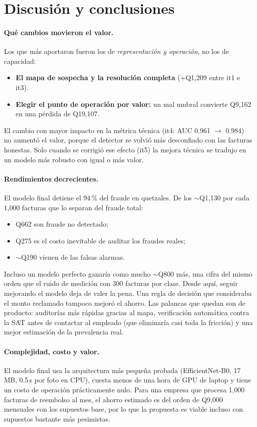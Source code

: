 \documentclass[11pt,letterpaper]{article}
\begin{document}
\section{Discusión y conclusiones}

\paragraph{Qué cambios movieron el valor.} Los que más aportaron fueron los de \emph{representación y operación}, no los de capacidad:
\begin{itemize}
  \item \textbf{El mapa de sospecha y la resolución completa} (+Q1,209 entre it1 e it3).
  \item \textbf{Elegir el punto de operación por valor:} un mal umbral convierte Q9,162 en una pérdida de Q19,107.
\end{itemize}
El cambio con mayor impacto en la métrica técnica (it4: AUC 0.961 $\to$ 0.984) no aumentó el valor, porque el detector se volvió más desconfiado con las facturas honestas. Solo cuando se corrigió ese efecto (it5) la mejora técnica se tradujo en un modelo más robusto con igual o más valor.

\paragraph{Rendimientos decrecientes.} El modelo final detiene el 94\,\% del fraude en quetzales. De los ${\sim}$Q1,130 por cada 1,000 facturas que lo separan del fraude total:
\begin{itemize}
  \item Q662 son fraude no detectado;
  \item Q275 es el costo inevitable de auditar los fraudes reales;
  \item ${\sim}$Q190 vienen de las falsas alarmas.
\end{itemize}
Incluso un modelo perfecto ganaría como mucho ${\sim}$Q800 más, una cifra del mismo orden que el ruido de medición con 300 facturas por clase. Desde aquí, seguir mejorando el modelo deja de valer la pena. Una regla de decisión que consideraba el monto reclamado tampoco mejoró el ahorro. Las palancas que quedan son de producto: auditorías más rápidas gracias al mapa, verificación automática contra la SAT antes de contactar al empleado (que eliminaría casi toda la fricción) y una mejor estimación de la prevalencia real.

\paragraph{Complejidad, costo y valor.} El modelo final usa la arquitectura más pequeña probada (EfficientNet-B0, 17\,MB, 0.5\,s por foto en CPU), cuesta menos de una hora de GPU de laptop y tiene un costo de operación prácticamente nulo. Para una empresa que procesa 1,000 facturas de reembolso al mes, el ahorro estimado es del orden de Q9,000 mensuales con los supuestos base, por lo que la propuesta es viable incluso con supuestos bastante más pesimistas.
\end{document}
